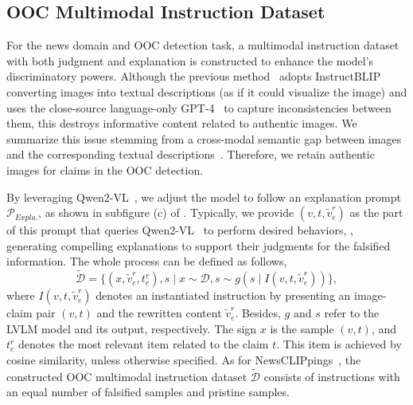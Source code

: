\subsection{OOC Multimodal Instruction Dataset}

For the news domain and OOC detection task, a multimodal instruction dataset with both judgment and explanation is constructed to enhance the model's discriminatory powers. Although the previous method~\cite{qi2024sniffer} adopts InstructBLIP~\cite{dai2023instructblip} converting images into textual descriptions (as if it could visualize the image) and uses the close-source language-only GPT-4~\cite{achiam2023gpt} to capture inconsistencies between them, this destroys informative content related to authentic images. We summarize this issue stemming from a cross-modal semantic gap between images and the corresponding textual descriptions~\cite{jiang2024hallucination}. Therefore, we retain authentic images for claims in the OOC detection.

By leveraging Qwen2-VL~\cite{wang2024qwen2}, we adjust the model to follow an explanation prompt $\mathcal{P}_{Expla.}$, as shown in subfigure (c) of . Typically, we provide $(v,t, \widetilde{v}^r_e)$ as the part of this prompt that queries Qwen2-VL~\cite{wang2024qwen2} to perform desired behaviors, \ie, generating compelling explanations to support their judgments for the falsified information. The whole process can be defined as follows,
\begin{equation}\label{eq:vcg_5}
  \widetilde{\mathcal{D}} = \{(x,\widetilde{v}^r_e,{t}^r_e),s\mid x \sim \mathcal{D}, s \sim g(s \mid I(v,t,\widetilde{v}^r_e))\},
\end{equation}
where $I(v,t,\widetilde{v}^r_e)$ denotes an instantiated instruction by presenting an image-claim pair $(v,t)$ and the rewritten content $\widetilde{v}^r_e$. Besides, $g$ and $s$ refer to the LVLM model and its output, respectively. The sign $x$ is the sample $(v,t)$, and ${t}^r_e$ denotes the most relevant item related to the claim $t$. This item is achieved by cosine similarity, unless otherwise specified. As for NewsCLIPpings~\cite{luo2021newsclippings}, the constructed OOC multimodal instruction dataset $\widetilde{\mathcal{D}}$ consists of instructions with an equal number of falsified samples and pristine samples.